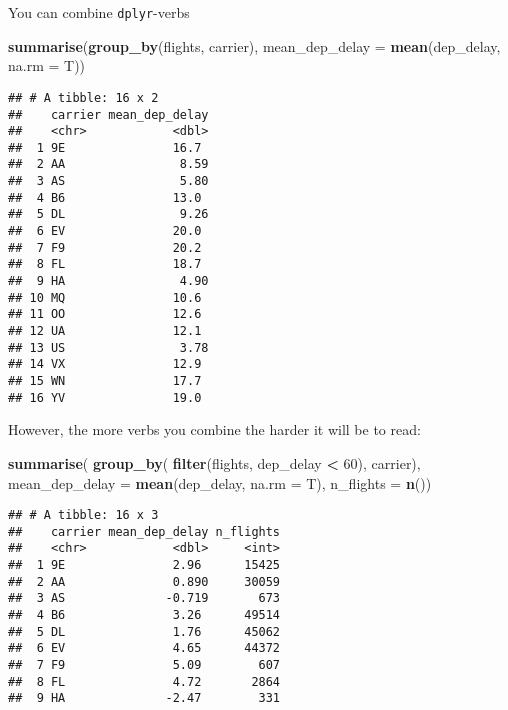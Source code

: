 \documentclass[]{book}
\newenvironment{Shaded}{\begin{snugshade}}{\end{snugshade}}
\newcommand{\DataTypeTok}[1]{\textcolor[rgb]{0.13,0.29,0.53}{#1}}
\newcommand{\DecValTok}[1]{\textcolor[rgb]{0.00,0.00,0.81}{#1}}
\newcommand{\KeywordTok}[1]{\textcolor[rgb]{0.13,0.29,0.53}{\textbf{#1}}}
\newcommand{\NormalTok}[1]{#1}
\newcommand{\OperatorTok}[1]{\textcolor[rgb]{0.81,0.36,0.00}{\textbf{#1}}}
\newcommand{\StringTok}[1]{\textcolor[rgb]{0.31,0.60,0.02}{#1}}
\begin{document}
You can combine \texttt{dplyr}-verbs

\begin{Shaded}
\begin{Highlighting}[]
\KeywordTok{summarise}\NormalTok{(}\KeywordTok{group_by}\NormalTok{(flights, carrier),}
          \DataTypeTok{mean_dep_delay =} \KeywordTok{mean}\NormalTok{(dep_delay, }\DataTypeTok{na.rm =}\NormalTok{ T))}
\end{Highlighting}
\end{Shaded}

\begin{verbatim}
## # A tibble: 16 x 2
##    carrier mean_dep_delay
##    <chr>            <dbl>
##  1 9E               16.7 
##  2 AA                8.59
##  3 AS                5.80
##  4 B6               13.0 
##  5 DL                9.26
##  6 EV               20.0 
##  7 F9               20.2 
##  8 FL               18.7 
##  9 HA                4.90
## 10 MQ               10.6 
## 11 OO               12.6 
## 12 UA               12.1 
## 13 US                3.78
## 14 VX               12.9 
## 15 WN               17.7 
## 16 YV               19.0
\end{verbatim}

However, the more verbs you combine the harder it will be to read:

\begin{Shaded}
\begin{Highlighting}[]
\KeywordTok{summarise}\NormalTok{(}
  \KeywordTok{group_by}\NormalTok{(}
    \KeywordTok{filter}\NormalTok{(flights, dep_delay }\OperatorTok{<}\StringTok{ }\DecValTok{60}\NormalTok{),}
\NormalTok{    carrier),}
  \DataTypeTok{mean_dep_delay =} \KeywordTok{mean}\NormalTok{(dep_delay, }\DataTypeTok{na.rm =}\NormalTok{ T), }\DataTypeTok{n_flights =} \KeywordTok{n}\NormalTok{())}
\end{Highlighting}
\end{Shaded}

\begin{verbatim}
## # A tibble: 16 x 3
##    carrier mean_dep_delay n_flights
##    <chr>            <dbl>     <int>
##  1 9E               2.96      15425
##  2 AA               0.890     30059
##  3 AS              -0.719       673
##  4 B6               3.26      49514
##  5 DL               1.76      45062
##  6 EV               4.65      44372
##  7 F9               5.09        607
##  8 FL               4.72       2864
##  9 HA              -2.47        331
## 10 MQ               1.48      23126
## 11 OO              -2.88         25
## 12 UA               4.33      54080
## 13 US              -0.744     19094
## 14 VX               2.70       4766
## 15 WN               6.60      10999
## 16 YV               2.25        465
\end{verbatim}
\end{document}
